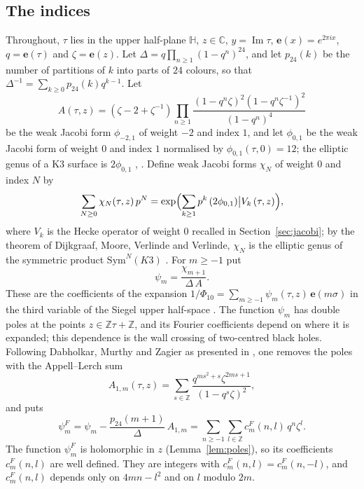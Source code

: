 \documentclass[11pt]{amsart}
\theoremstyle{definition}
\newcommand{\ZZ}{\mathbb{Z}}
\newcommand{\CC}{\mathbb{C}}
\newcommand{\HH}{\mathbb{H}}
\newcommand{\pf}{p_{24}}
\newcommand{\cF}{c^{F}}
\newcommand{\e}{\mathbf{e}}
\begin{document}
\subsection*{The indices}
Throughout, $\tau$ lies in the upper half-plane $\HH$, $z\in\CC$, $y=\operatorname{Im}\tau$, $\e(x)=e^{2\pi ix}$, $q=\e(\tau)$ and $\zeta=\e(z)$. Let $\Delta=q\prod_{n\ge1}(1-q^n)^{24}$, and let $\pf(k)$ be the number of partitions of $k$ into parts of $24$ colours, so that $\Delta^{-1}=\sum_{k\ge0}\pf(k)q^{k-1}$. Let
\[
A(\tau,z)=(\zeta-2+\zeta^{-1})\prod_{n\ge1}\frac{(1-q^n\zeta)^2(1-q^n\zeta^{-1})^2}{(1-q^n)^4}
\]
be the weak Jacobi form $\phi_{-2,1}$ of weight $-2$ and index $1$, and let $\phi_{0,1}$ be the weak Jacobi form of weight $0$ and index $1$ normalised by $\phi_{0,1}(\tau,0)=12$; the elliptic genus of a K3 surface is $2\phi_{0,1}$ \cite[\S9]{EZ85}, \cite{DMVV97}. Define weak Jacobi forms $\chi_N$ of weight $0$ and index $N$ by
\begin{equation}\label{eq:dmvv}
\sum_{N\ge0}\chi_N(\tau,z)\,p^N=\exp\Bigl(\sum_{k\ge1}p^k\,(2\phi_{0,1})\big|V_k\,(\tau,z)\Bigr),
\end{equation}
where $V_k$ is the Hecke operator of weight $0$ recalled in Section~\ref{sec:jacobi}; by the theorem of Dijkgraaf, Moore, Verlinde and Verlinde, $\chi_N$ is the elliptic genus of the symmetric product $\mathrm{Sym}^N(K3)$ \cite{DMVV97}. For $m\ge-1$ put
\begin{equation}\label{eq:psim}
\psi_m=\frac{\chi_{m+1}}{\Delta\,A}.
\end{equation}
These are the coefficients of the expansion $1/\Phi_{10}=\sum_{m\ge-1}\psi_m(\tau,z)\,\e(m\sigma)$ in the third variable of the Siegel upper half-space \cite[\S3.1]{BM13}. The function $\psi_m$ has double poles at the points $z\in\ZZ\tau+\ZZ$, and its Fourier coefficients depend on where it is expanded; this dependence is the wall crossing of two-centred black holes. Following Dabholkar, Murthy and Zagier as presented in \cite[\S3.1]{BM13}, one removes the poles with the Appell--Lerch sum
\begin{equation}\label{eq:appell}
A_{1,m}(\tau,z)=\sum_{s\in\ZZ}\frac{q^{ms^2+s}\zeta^{2ms+1}}{(1-q^s\zeta)^2},
\end{equation}
and puts
\begin{equation}\label{eq:psiF}
\psi^F_m=\psi_m-\frac{\pf(m+1)}{\Delta}\,A_{1,m}=\sum_{n\ge-1}\sum_{l\in\ZZ}\cF_m(n,l)\,q^n\zeta^l .
\end{equation}
The function $\psi^F_m$ is holomorphic in $z$ (Lemma~\ref{lem:poles}), so its coefficients $\cF_m(n,l)$ are well defined. They are integers with $\cF_m(n,l)=\cF_m(n,-l)$, and $\cF_m(n,l)$ depends only on $4mn-l^2$ and on $l$ modulo $2m$.
\end{document}
